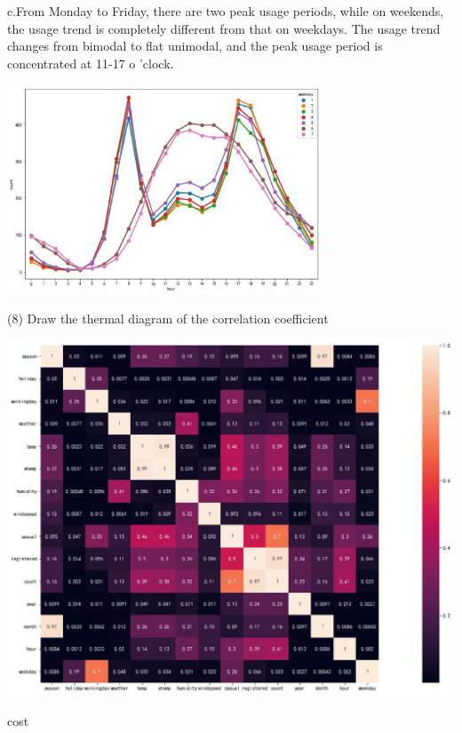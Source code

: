 c.From Monday to Friday, there are two peak usage periods, while on weekends, the usage trend is completely different from that on weekdays. The usage trend changes from bimodal to flat unimodal, and the peak usage period is concentrated at 11-17 o 'clock.
\begin{center}
  \begin{minipage}{1\linewidth}
    \centering
    \includegraphics[width=0.7\textwidth]{pic/three hour2 (1).eps}
  \end{minipage}
  \hfill
\end{center}
 
(8)  Draw the thermal diagram of the correlation coefficient

\begin{center}
  \begin{minipage}{1\linewidth}
    \centering
    \includegraphics[height=0.5\textwidth]{pic/hot (1).eps}
  \end{minipage}
  \hfill
\end{center}


\begin{center}

  \begin{minipage}{0.3\linewidth}
  \centering

  
  {\small{cost}}

  \end{minipage}
\end{center}


